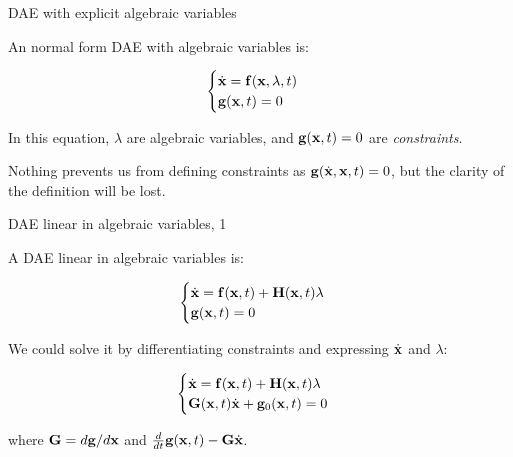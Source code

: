 \documentclass{beamer}
\begin{document}
\begin{frame}{DAE with explicit algebraic variables}
	\begin{flushleft}
		
		An normal form DAE with algebraic variables is:
		
		\begin{equation}
			\begin{cases}
				\dot{\mathbf{x}} = \mathbf{f}(\mathbf{x}, \lambda, t) \\
				\mathbf{g}(\mathbf{x}, t) = 0
			\end{cases}
		\end{equation}
	
		In this equation, $\lambda$ are algebraic variables, and $\mathbf{g}(\mathbf{x}, t) = 0$ are \emph{constraints}.
		
		\bigskip
		
		\textcolor{mygrey}{
		Nothing prevents us from defining constraints as $\mathbf{g}(\dot{\mathbf{x}}, \mathbf{x}, t) = 0$, but the clarity of the definition will be lost.
		}

	\end{flushleft}
\end{frame}


\begin{frame}{DAE linear in algebraic variables, 1}
	\begin{flushleft}
		
		A DAE linear in algebraic variables is:
		
		\begin{equation}
			\begin{cases}
				\dot{\mathbf{x}} = \mathbf{f}(\mathbf{x}, t) + \mathbf{H}(\mathbf{x}, t) \lambda \\
				\mathbf{g}(\mathbf{x}, t) = 0
			\end{cases}
		\end{equation}
		
		We could solve it by differentiating constraints and expressing $\dot{\mathbf{x}}$ and $\lambda$:
		
		\begin{equation}
		\begin{cases}
			\dot{\mathbf{x}} = \mathbf{f}(\mathbf{x}, t) + \mathbf{H}(\mathbf{x}, t) \lambda \\
			\mathbf{G}(\mathbf{x}, t)\dot{\mathbf{x}} + \mathbf{g}_0(\mathbf{x}, t)  = 0
		\end{cases}
		\end{equation}
	
		where $\mathbf{G} = d\mathbf{g} / d\mathbf{x}$ and $\frac{d}{dt} \mathbf{g}(\mathbf{x}, t) - \mathbf{G}\dot{\mathbf{x}}$.
		
	\end{flushleft}
\end{frame}
\end{document}
